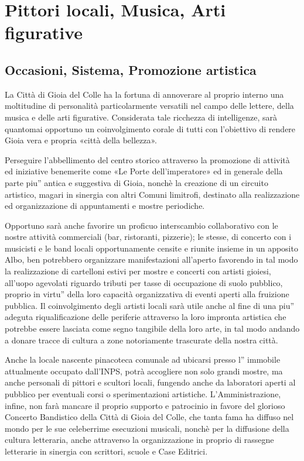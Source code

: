 \documentclass[a4paper,14pt,italian]{sphinxmanual}
\begin{document}
\section{Pittori locali, Musica, Arti figurative}
\label{\detokenize{cultura:pittori-locali-musica-arti-figurative}}

\subsection{Occasioni, Sistema, Promozione artistica}
\label{\detokenize{cultura:occasioni-sistema-promozione-artistica}}
La Città di Gioia del Colle ha la fortuna di annoverare al proprio interno una moltitudine di personalità particolarmente versatili nel campo delle lettere, della musica e delle arti figurative. Considerata tale ricchezza di intelligenze, sarà quantomai opportuno un coinvolgimento corale di tutti con l’obiettivo di rendere Gioia vera e propria «città della bellezza».

Perseguire l’abbellimento del centro storico attraverso la promozione di attività ed iniziative benemerite come «Le Porte dell’imperatore» ed in generale della parte piu” antica e suggestiva di Gioia, nonchè la creazione di un circuito artistico, magari in sinergia con altri Comuni limitrofi, destinato alla realizzazione ed organizzazione di appuntamenti e mostre periodiche.

Opportuno sarà anche favorire un proficuo interscambio collaborativo con le nostre attività commerciali (bar, ristoranti, pizzerie); le stesse, di concerto con i musicisti e le band locali opportunamente censite e riunite insieme in un apposito Albo, ben potrebbero organizzare manifestazioni all’aperto favorendo in tal modo la realizzazione di cartelloni estivi per mostre e concerti con artisti gioiesi, all’uopo agevolati riguardo tributi per tasse di occupazione di suolo pubblico, proprio in virtu” della loro capacità organizzativa di eventi aperti alla fruizione pubblica.
Il coinvolgimento degli artisti locali sarà utile anche al fine di una piu” adeguta riqualificazione delle periferie attraverso la loro impronta artistica che potrebbe essere lasciata come segno tangibile della loro arte, in tal modo andando a donare tracce di cultura a zone notoriamente trascurate della nostra città.

Anche la locale nascente pinacoteca comunale ad ubicarsi presso l” immobile attualmente occupato dall’INPS, potrà accogliere non solo grandi mostre, ma anche personali di pittori e scultori locali, fungendo anche da laboratori aperti al pubblico per eventuali corsi o sperimentazioni artistiche.
L’Amministrazione, infine, non farà mancare il proprio supporto e patrocinio in favore del glorioso Concerto Bandistico della Città di Gioia del Colle, che tanta fama ha diffuso nel mondo per le sue celeberrime esecuzioni musicali, nonchè per la diffusione della cultura letteraria, anche attraverso la organizzazione in proprio di rassegne letterarie in sinergia con scrittori, scuole e Case Editrici.
\end{document}
